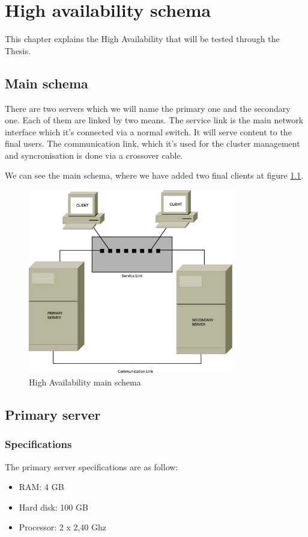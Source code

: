 

\chapter{High availability schema}
This chapter explains the High Availability that will be tested through the Thesis. 

\section {Main schema}
There are two servers which we will name the primary one and the secondary one. Each of them are linked by two means. The service link is the main network interface which it's connected via a normal switch. It will serve content to the final users. The communication link, which it's used for the cluster management and syncronisation is done via a crossover cable.

We can see the main schema, where we have added two final clients at figure \ref{fig:main-schema}.

\begin{figure}
  \centering
    \includegraphics[width=0.8\textwidth]{img/ha_main_schema.eps}
  \caption{High Availability main schema}
  \label{fig:main-schema}
\end{figure}

\section {Primary server}
\subsection {Specifications}
The primary server specifications are as follow:
\begin{itemize}
  \item RAM: 4 GB
  \item Hard disk: 100 GB
  \item Processor: 2 x 2,40 Ghz
\end{itemize}

